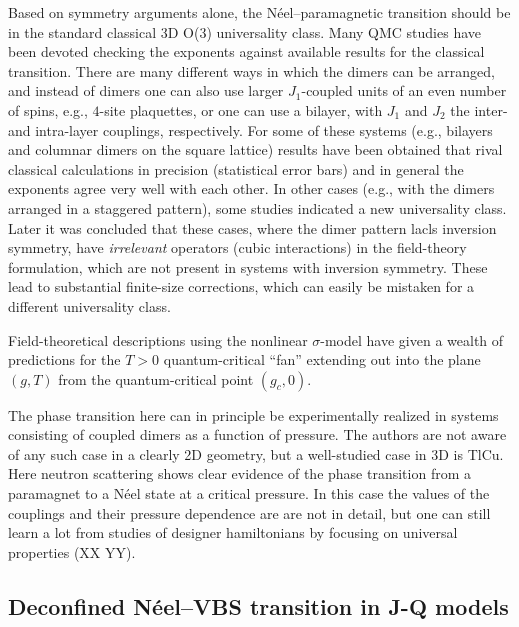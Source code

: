 \documentclass[range]{ar2e}
\begin{document}
Based on symmetry arguments alone, the N\'eel--paramagnetic transition should be in the standard classical 3D O($3$) universality class. Many QMC studies 
have been devoted checking the exponents against available results for the classical transition. There are many different ways in which the dimers can be 
arranged, and instead of dimers one can also use larger $J_1$-coupled units of an even number of spins, e.g., $4$-site plaquettes, or one can use a
bilayer, with $J_1$ and $J_2$ the inter-and intra-layer couplings, respectively. For some of these systems (e.g., bilayers and columnar dimers on the
square lattice) results have been obtained that rival classical calculations in precision (statistical error bars) and in general the exponents agree 
very well with each other. In other cases (e.g., with the dimers arranged in a staggered pattern), some studies indicated a new universality class.
Later it was concluded that these cases, where the dimer pattern lacls inversion symmetry, have {\it irrelevant} operators (cubic interactions) in 
the field-theory formulation, which are not present in systems with inversion symmetry. These lead to substantial finite-size corrections, which can
easily be mistaken for a different universality class.

Field-theoretical descriptions using the nonlinear $\sigma$-model \cite{Haldane83,Chakravarty89} have given a wealth of predictions \cite{Chubukov94}
for the $T>0$ quantum-critical ``fan'' extending out into the plane $(g,T)$  from the quantum-critical point $(g_c,0)$. 

The phase transition here can in principle be experimentally realized in systems consisting of coupled dimers as a function of pressure. The authors 
are not aware of any such case in a clearly 2D geometry, but a well-studied case in 3D is TlCu. Here neutron scattering shows clear evidence of the 
phase transition from a paramagnet to a N\'eel state at a critical pressure. In this case the values of the couplings and their pressure dependence
are are not in detail, but one can still learn a lot from studies of designer hamiltonians by focusing on universal properties (XX YY).

\subsection{Deconfined N\'eel--VBS transition in J-Q models}
\end{document}
